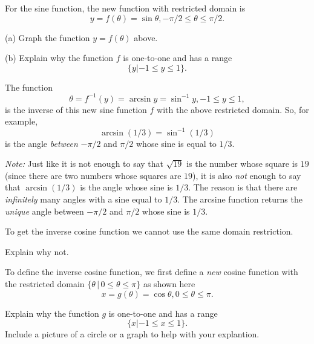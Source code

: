 \documentclass{ximera}
\begin{document}
For the sine function, the new function with restricted domain is 
\[
    y  = f(\theta) = \sin \theta , -\pi/2 \leq \theta \leq \pi/2 . 
\]

\begin{question}  \label{Q1:Inverse}
(a) Graph the function $y=f(\theta)$ above.

(b) Explain why the function $f$ is one-to-one and has a range 
\[
   \{y | -1 \leq y \leq 1\}. 
\]
\end{question}

The function
\[
   \theta = f^{-1}(y) = \arcsin y = \sin^{-1} y , -1\leq y \leq 1 ,
\]
is the inverse of this new sine function $f$ with the above restricted domain. So, for example, 
\[
    \arcsin (1/3) = \sin^{-1}(1/3)
\]
is the angle \emph{between} $-\pi/2$ and $\pi/2$ whose sine is equal to $1/3$. 

\emph{Note:} Just like it is not enough to say that $\sqrt{19}$ is the number whose square is $19$ (since there are two numbers whose squares are $19$), it is also \emph{not} enough to say that $\arcsin (1/3)$ is the angle whose sine is $1/3$. The reason is that there are \emph{infinitely} many angles with a sine equal to $1/3$. The arcsine function returns the \emph{unique} angle between $-\pi/2$ and $\pi/2$ whose sine is $1/3$.



To get the inverse cosine function we cannot use the same domain restriction.

\begin{question}  \label{Q2:Inverse}
Explain why not.
\end{question}

To define the inverse cosine function, we first define a \emph{new} cosine function with the restricted domain $\{\theta \, | \, 0\leq \theta \leq \pi \}$ as shown here
\[
    x  = g(\theta) = \cos \theta , 0 \leq \theta \leq \pi . 
\]

\begin{question}  \label{Q3:Inverse}
Explain why the function $g$ is one-to-one and has a range 
\[
   \{x | -1 \leq x \leq 1\}. 
\]
Include a picture of a circle or a graph to help with your explantion.
\end{question}
\end{document}
